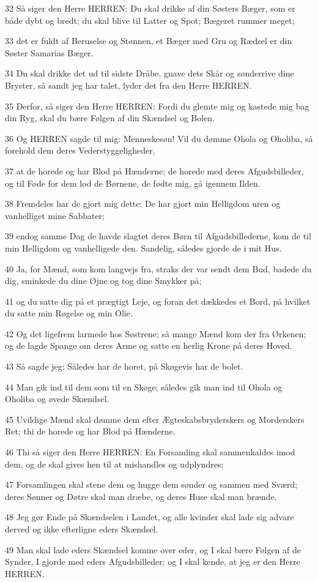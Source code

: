 \par 32 Så siger den Herre HERREN: Du skal drikke af din Søsters Bæger, som er både dybt og bredt; du skal blive til Latter og Spot; Bægeret rummer meget;
\par 33 det er fuldt af Beruselse og Stønnen, et Bæger med Gru og Rædsel er din Søster Samarias Bæger.
\par 34 Du skal drikke det ud til sidste Dråbe, gnave dets Skår og sønderrive dine Bryster, så sandt jeg har talet, lyder det fra den Herre HERREN.
\par 35 Derfor, så siger den Herre HERREN: Fordi du glemte mig og kastede mig bag din Ryg, skal du bære Følgen af din Skændsel og Bolen.
\par 36 Og HERREN sagde til mig: Menneskesøn! Vil du dømme Ohola og Oholiba, så forehold dem deres Vederstyggeligheder,
\par 37 at de horede og har Blod på Hænderne; de horede med deres Afgudsbilleder, og til Føde for dem lod de Børnene, de fødte mig, gå igennem Ilden.
\par 38 Fremdeles har de gjort mig dette: De har gjort min Helligdom uren og vanhelliget mine Sabbater;
\par 39 endog samme Dag de havde slagtet deres Børn til Afgudsbillederne, kom de til min Helligdom og vanhelligede den. Sandelig, således gjorde de i mit Hus.
\par 40 Ja, for Mænd, som kom langvejs fra, straks der var sendt dem Bud, badede du dig, sminkede du dine Øjne og tog dine Smykker på;
\par 41 og du satte dig på et prægtigt Leje, og foran det dækkedes et Bord, på hvilket du satte min Røgelse og min Olie.
\par 42 Og det ligefrem larmede hos Søstrene; så mange Mænd kom der fra Ørkenen; og de lagde Spange om deres Arme og satte en herlig Krone på deres Hoved.
\par 43 Så sagde jeg: Således har de horet, på Skøgevis har de bolet.
\par 44 Man gik ind til dem som til en Skøge; således gik man ind til Ohola og Oholiba og øvede Skændsel.
\par 45 Uvildige Mænd skal dømme dem efter Ægteskabsbryderskers og Morderskers Ret; thi de horede og har Blod på Hænderne.
\par 46 Thi så siger den Herre HERREN: En Forsamling skal sammenkaldes imod dem, og de skal gives hen til at mishandles og udplyndres;
\par 47 Forsamlingen skal stene dem og hugge dem sønder og sammen med Sværd; deres Sønner og Døtre skal man dræbe, og deres Huse skal man brænde.
\par 48 Jeg gør Ende på Skændselen i Landet, og alle kvinder skal lade sig advare derved og ikke efterligne eders Skændsel.
\par 49 Man skal lade eders Skændsel komme over eder, og I skal bære Følgen af de Synder, I gjorde med eders Afgudsbilleder; og I skal kende, at jeg er den Herre HERREN.

